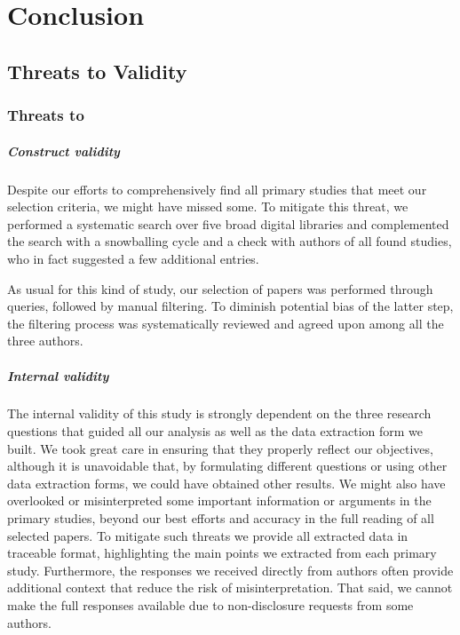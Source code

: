 \chapter{Conclusion}\label{chap:conclusion}

\section{Threats to Validity}\label{sec:threats}

\subsection{Threats to  }

\paragraph{Construct validity} Despite our efforts to comprehensively find all primary studies that meet our selection criteria, we might have missed some.
To mitigate this threat, we performed a systematic search over five broad digital libraries and complemented the search with a snowballing cycle and a check with authors of all found studies, who in fact suggested a few additional entries.

As usual for this kind of study, our selection of papers was performed through queries, followed by manual filtering.
To diminish potential bias of the latter step, the filtering process was systematically reviewed and agreed upon among all the three authors.

\paragraph{Internal validity} The internal validity of this study is strongly dependent on the three research questions that guided all our analysis as well as the data extraction form we  built.
We took great care in ensuring that they properly reflect our objectives, although it is unavoidable that, by formulating  different questions or using other data extraction forms, we could have obtained other results.
We might also have overlooked or misinterpreted some important information or arguments in the primary studies, beyond our best efforts and accuracy in the full reading of all selected papers.
To mitigate such threats we provide all extracted data in traceable format, highlighting the main points we extracted from each primary study.
Furthermore, the responses we received directly from authors often provide additional context that reduce the risk of misinterpretation.
That said, we cannot make the full responses available due to non-disclosure requests from some authors.

